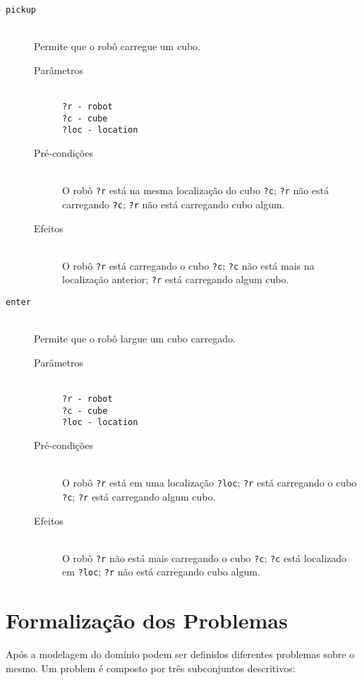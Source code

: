\documentclass[letterpaper]{article}
\begin{document}
\begin{description}
\item[\texttt{pickup}] \hfill\\
  Permite que o robô carregue um cubo.
    \begin{description}
      \item[Parâmetros] \hfill\\
        \texttt{?r - robot\\?c - cube\\?loc - location}
      \item[Pré-condições] \hfill\\
        O robô \texttt{?r} está na mesma localização do cubo \texttt{?c}; \texttt{?r} não está carregando \texttt{?c}; \texttt{?r} não está carregando cubo algum.
      \item[Efeitos] \hfill\\
        O robô \texttt{?r} está carregando o cubo \texttt{?c}; \texttt{?c} não está mais na localização anterior; \texttt{?r} está carregando algum cubo.
    \end{description}

\item[\texttt{enter}] \hfill\\
  Permite que o robô largue um cubo carregado.
    \begin{description}
      \item[Parâmetros] \hfill\\
        \texttt{?r - robot\\?c - cube\\?loc - location}
      \item[Pré-condições] \hfill\\
        O robô \texttt{?r} está em uma localização \texttt{?loc}; \texttt{?r} está carregando o cubo \texttt{?c}; \texttt{?r} está carregando algum cubo.
      \item[Efeitos] \hfill\\
        O robô \texttt{?r} não está mais carregando o cubo \texttt{?c}; \texttt{?c} está localizado em \texttt{?loc}; \texttt{?r} não está carregando cubo algum.
    \end{description}
\end{description}

\section{Formalização dos Problemas}

Após a modelagem do domínio podem ser definidos diferentes problemas sobre o mesmo. Um problem é composto por três subconjuntos descritivos:
\end{document}
